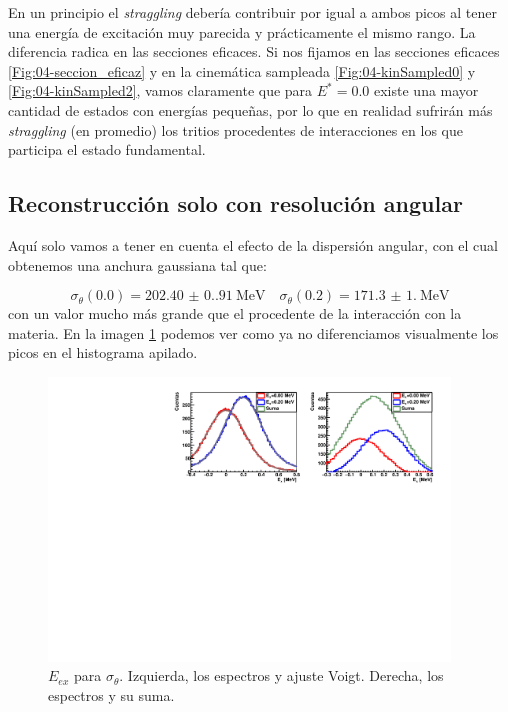 \vspace*{-0.25cm}


En un principio el \textit{straggling}  debería contribuir por igual a ambos picos al tener una energía de excitación muy parecida y prácticamente el mismo rango. La diferencia radica en las secciones eficaces. Si nos fijamos en las secciones eficaces \cref{Fig:04-seccion_eficaz} y en la cinemática sampleada \cref{Fig:04-kinSampled0} y \cref{Fig:04-kinSampled2}, vamos claramente que para $E^*=0.0$ existe una mayor cantidad de estados con energías pequeñas, por lo que en realidad sufrirán más \textit{straggling} (en promedio) los tritios procedentes de interacciones en los que participa el estado fundamental. 


\vspace*{-0.45cm}
\subsection{Reconstrucción solo con resolución angular}

Aquí solo vamos a tener en cuenta el efecto de la dispersión angular, con el cual obtenemos una anchura gaussiana tal que: 

\begin{equation}
    \sigma_{\theta}(0.0) = \num{202.40(0.91)} \ \text{MeV} \quad 
    \sigma_{\theta}(0.2) = \num{171.3(1.0)} \ \text{MeV}
\end{equation} 
con un valor mucho más grande que el procedente de la interacción con la materia. En la imagen \cref{Fig:05-RecExcIdx2} podemos ver como ya no diferenciamos visualmente los picos en el histograma apilado. 

\vspace*{-0.25cm}
\begin{figure}[H]
    \centering
    \includegraphics[width=0.95\textwidth]{Imagenes/Rec_incIdx2_single.pdf}
    \caption{$E_{ex}$ para $\sigma_{\theta}$. Izquierda, los espectros y ajuste Voigt. Derecha, los espectros y su suma.}
    \label{Fig:05-RecExcIdx2}
\end{figure}

